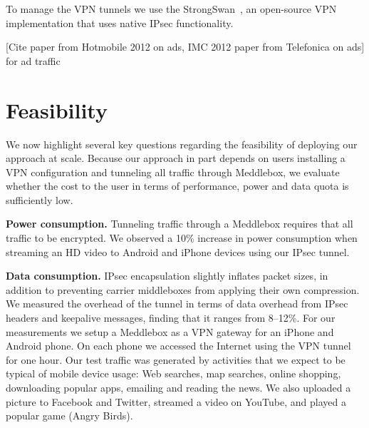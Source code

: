 \documentclass{sig-alternate-10pt}
\newcommand{\meddlebox}{{Meddlebox}\xspace}
\begin{document}
To manage the VPN tunnels we use the StrongSwan~\cite{strongswan}, an
open-source VPN implementation that uses native IPsec functionality.

[Cite paper from Hotmobile 2012 on ads, IMC 2012 paper from Telefonica
on ads] for ad traffic 





\section{Feasibility}
\label{sec:eval}
We now highlight several key questions regarding the feasibility of
deploying our approach at scale. Because our approach in part depends
on users installing a VPN configuration and tunneling all traffic
through \meddlebox, we evaluate whether the cost to the user in terms
of performance, power and data quota is sufficiently low. 

\noindent\textbf{Power consumption.} Tunneling traffic through a
\meddlebox requires that all traffic to be encrypted. We observed a 
10\% increase in power consumption when streaming an HD 
video to Android and iPhone devices using our IPsec tunnel. 


\noindent\textbf{Data consumption.} IPsec encapsulation slightly
inflates packet sizes, in addition to preventing carrier middleboxes
from applying their own compression. We measured the overhead of the
tunnel in terms of data overhead from IPsec headers and keepalive
messages, finding that it ranges from 8--12\%. For our measurements we
setup a \meddlebox as a VPN gateway for an iPhone and Android
phone. On each phone we accessed the Internet using the VPN tunnel for
one hour. Our test traffic was generated by activities that we 
expect to be typical of mobile device usage: Web searches, map
searches, online shopping, downloading popular apps, emailing and
reading the news. We also uploaded a picture to Facebook and Twitter,
streamed a video on YouTube, and played a popular game (Angry Birds).
\end{document}
